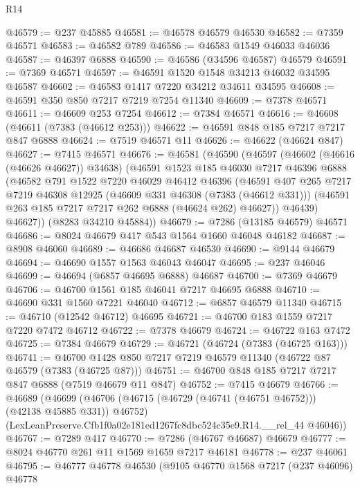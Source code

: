\begin{lexlean}{R14}
\begin{coremodule}
@46579 := @237 @45885
@46581 := @46578 @46579 @46530
@46582 := @7359 @46571
@46583 := @46582 @789
@46586 := @46583 @1549 @46033 @46036
@46587 := @46397 @6888
@46590 := @46586 (@34596 @46587) @46579
@46591 := @7369 @46571
@46597 := @46591 @1520 @1548 @34213 @46032 @34595 @46587
@46602 := @46583 @1417 @7220 @34212 @34611 @34595
@46608 := @46591 @350 @850 @7217 @7219 @7254 @11340
@46609 := @7378 @46571
@46611 := @46609 @253 @7254
@46612 := @7384 @46571
@46616 := @46608 (@46611 (@7383 (@46612 @253)))
@46622 := @46591 @848 @185 @7217 @7217 @847 @6888
@46624 := @7519 @46571 @11
@46626 := @46622 (@46624 @847)
@46627 := @7415 @46571
@46676 := @46581
    (@46590
      (@46597
        (@46602 (@46616 (@46626 @46627)) @34638)
        (@46591
          @1523
          @185
          @46030
          @7217
          @46396
          @6888
          (@46582
            @791
            @1522
            @7220
            @46029
            @46412
            @46396
            (@46591
              @407
              @265
              @7217
              @7219
              @46308
              @12925
              (@46609 @331 @46308 (@7383 (@46612 @331)))
              (@46591 @263 @185 @7217 @7217 @262 @6888 (@46624 @262) @46627))
            @46439)
          @46627))
      (@8283 @34210 @45884))
@46679 := @7286 (@13185 @46579) @46571
@46686 := @8024 @46679 @417 @543 @1564 @1660 @46048 @46182
@46687 := @8908 @46060
@46689 := @46686 @46687 @46530
@46690 := @9144 @46679
@46694 := @46690 @1557 @1563 @46043 @46047
@46695 := @237 @46046
@46699 := @46694 (@6857 @46695 @6888) @46687
@46700 := @7369 @46679
@46706 := @46700 @1561 @185 @46041 @7217 @46695 @6888
@46710 := @46690 @331 @1560 @7221 @46040
@46712 := @6857 @46579 @11340
@46715 := @46710 (@12542 @46712) @46695
@46721 := @46700 @183 @1559 @7217 @7220 @7472 @46712
@46722 := @7378 @46679
@46724 := @46722 @163 @7472
@46725 := @7384 @46679
@46729 := @46721 (@46724 (@7383 (@46725 @163)))
@46741 := @46700 @1428 @850 @7217 @7219 @46579 @11340 (@46722 @87 @46579 (@7383 (@46725 @87)))
@46751 := @46700 @848 @185 @7217 @7217 @847 @6888 (@7519 @46679 @11 @847)
@46752 := @7415 @46679
@46766 := @46689
    (@46699
      (@46706 (@46715 (@46729 (@46741 (@46751 @46752))) (@42138 @45885 @331)) @46752)
      (LexLeanPreserve.Cfb1f0a02e181ed1267fc8dbc524c35e9.R14.__rel_44 @46046))
@46767 := @7289 @417
@46770 := @7286 (@46767 @46687) @46679
@46777 := @8024 @46770 @261 @11 @1569 @1659 @7217 @46181
@46778 := @237 @46061
@46795 := @46777
    @46778
    @46530
    (@9105
      @46770
      @1568
      @7217
      (@237 @46096)
      @46778

\end{coremodule}
\end{lexlean}
